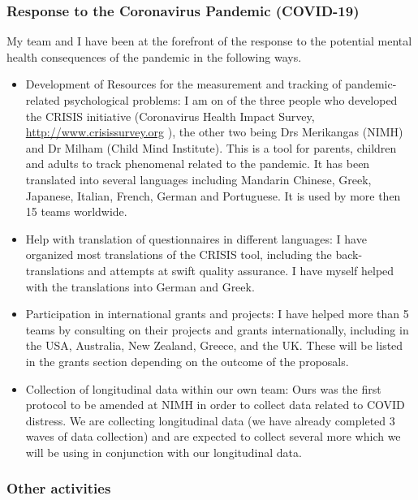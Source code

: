 \documentclass[
]{article}
\begin{document}
\hypertarget{response-to-the-coronavirus-pandemic-covid-19}{%
\subsubsection{Response to the Coronavirus Pandemic
(COVID-19)}\label{response-to-the-coronavirus-pandemic-covid-19}}

My team and I have been at the forefront of the response to the
potential mental health consequences of the pandemic in the following
ways.

\begin{itemize}
\item
  Development of Resources for the measurement and tracking of
  pandemic-related psychological problems: I am on of the three people
  who developed the CRISIS initiative (Coronavirus Health Impact Survey,
  \url{http://www.crisissurvey.org} ), the other two being Drs
  Merikangas (NIMH) and Dr Milham (Child Mind Institute). This is a tool
  for parents, children and adults to track phenomenal related to the
  pandemic. It has been translated into several languages including
  Mandarin Chinese, Greek, Japanese, Italian, French, German and
  Portuguese. It is used by more then 15 teams worldwide.
\item
  Help with translation of questionnaires in different languages: I have
  organized most translations of the CRISIS tool, including the
  back-translations and attempts at swift quality assurance. I have
  myself helped with the translations into German and Greek.
\item
  Participation in international grants and projects: I have helped more
  than 5 teams by consulting on their projects and grants
  internationally, including in the USA, Australia, New Zealand, Greece,
  and the UK. These will be listed in the grants section depending on
  the outcome of the proposals.
\item
  Collection of longitudinal data within our own team: Ours was the
  first protocol to be amended at NIMH in order to collect data related
  to COVID distress. We are collecting longitudinal data (we have
  already completed 3 waves of data collection) and are expected to
  collect several more which we will be using in conjunction with our
  longitudinal data.
\end{itemize}

\hypertarget{other-activities}{%
\subsubsection{Other activities}\label{other-activities}}
\end{document}
